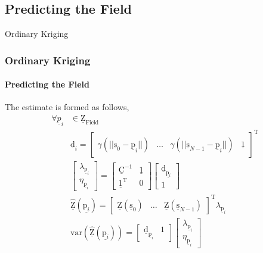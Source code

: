 \documentclass[professionalfont,10pt]{beamer}
\begin{document}
	\subsection{Predicting the Field}
	\begin{frame}[t]{Ordinary Kriging}
		\frametitle{Ordinary Kriging}
		\framesubtitle{Predicting the Field}
		\hskip-0.75cm
		\begin{minipage}[t]{0.2\linewidth}\vspace{-0.5cm}
			\tiny\tableofcontents[currentsection,currentsubsection,hideothersubsections,subsectionstyle=show/shaded]
		\end{minipage}
		\hfill%
		\begin{minipage}[t]{0.86\linewidth}\vspace{-0.5cm}
			The estimate is formed as follows,
			\begin{align*}
				\forall \underline{p}_i &\in \underline{\text{Z}}_\text{Field}\\
				& \underline{\text{d}}_i = 
				\left[\begin{array}{cccc}
					\gamma(||\underline{\text{s}}_0 - \underline{\text{p}}_i||) & \dots & \gamma(||\underline{\text{s}}_{N-1} - \underline{\text{p}}_i||) & \underline{1}
				\end{array}\right]^\text{T}\\
				& \left[\begin{array}{c}
				\lambda_{\underline{\text{p}}_i}\\
				\eta_{\underline{\text{p}}_i}
				\end{array}\right]
				=
				\left[\begin{array}{cc}
				\underline{\text{C}}^{-1} & \underline{1}\\
				\underline{1}^\text{T} & 0
				\end{array}\right]
				\left[\begin{array}{c}
				\underline{\text{d}}_\underline{\text{p}_i}\\
				1
				\end{array}\right]\\
				& \hat{\underline{\text{Z}}}(\underline{\text{p}_i}) = \left[\begin{array}{ccc}
				\underline{\text{Z}}(\underline{\text{s}}_0) & \dots & \underline{\text{Z}}(\underline{\text{s}}_{N-1})
				\end{array}\right]^\text{T}
				\lambda_{\underline{\text{p}}_i}\\
				&\text{var}(\hat{\underline{\text{Z}}}(\underline{\text{p}_i})) = 
				\left[\begin{array}{cc}
				\underline{\text{d}}_{\underline{\text{p}}_i} & 1
				\end{array}\right]
				\left[\begin{array}{c}
				\lambda_{\underline{\text{p}}_i}\\
				\eta_{\underline{\text{p}}_i}
				\end{array}\right]
			\end{align*}
		\end{minipage}
		\vfill%
	\end{frame}
\end{document}
